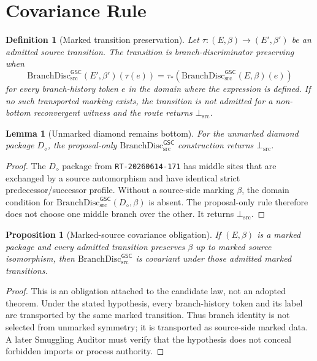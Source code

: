 \documentclass[11pt]{article}
\newcommand{\BottomSrc}{\bot_{\mathrm{src}}}
\newcommand{\Diamond}{D_{\diamond}}
\newcommand{\BranchDisc}{\mathrm{BranchDisc}_{\mathrm{src}}^{\mathsf{GSC}}}
\newtheorem{definition}{Definition}
\newtheorem{lemma}{Lemma}
\newtheorem{proposition}{Proposition}
\begin{document}
\section{Covariance Rule}

\begin{definition}[Marked transition preservation]
Let \(\tau:(E,\beta)\to(E',\beta')\) be an admitted source transition. The
transition is branch-discriminator preserving when
\[
  \BranchDisc(E',\beta')(\tau(e))=\tau_\ast(\BranchDisc(E,\beta)(e))
\]
for every branch-history token \(e\) in the domain where the expression is
defined. If no such transported marking exists, the transition is not admitted
for a non-bottom reconvergent witness and the route returns \(\BottomSrc\).
\end{definition}

\begin{lemma}[Unmarked diamond remains bottom]
For the unmarked diamond package \(\Diamond\), the proposal-only
\(\BranchDisc\) construction returns \(\BottomSrc\).
\end{lemma}

\begin{proof}
The \(\Diamond\) package from \texttt{RT-20260614-171} has middle sites that
are exchanged by a source automorphism and have identical strict
predecessor/successor profile. Without a source-side marking \(\beta\), the
domain condition for \(\BranchDisc(\Diamond,\beta)\) is absent. The
proposal-only rule therefore does not choose one middle branch over the other.
It returns \(\BottomSrc\).
\end{proof}

\begin{proposition}[Marked-source covariance obligation]
If \((E,\beta)\) is a marked package and every admitted transition preserves
\(\beta\) up to marked source isomorphism, then \(\BranchDisc\) is covariant
under those admitted marked transitions.
\end{proposition}

\begin{proof}
This is an obligation attached to the candidate law, not an adopted theorem.
Under the stated hypothesis, every branch-history token and its label are
transported by the same marked transition. Thus branch identity is not selected
from unmarked symmetry; it is transported as source-side marked data. A later
Smuggling Auditor must verify that the hypothesis does not conceal forbidden
imports or process authority.
\end{proof}
\end{document}
